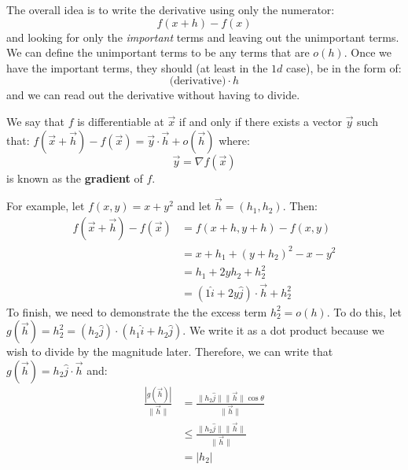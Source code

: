 \begin{itemize}
\begin{idea}
        The overall idea is to write the derivative using only the numerator:
        \begin{equation}
            f(x+h)-f(x)
        \end{equation}
        and looking for only the \textit{important} terms and leaving out the unimportant terms. We can define the unimportant terms to be any terms that are $o(h)$. Once we have the important terms, they should (at least in the $1d$ case), be in the form of:
        \begin{equation}
            \text{(derivative)} \cdot h
        \end{equation}
        and we can read out the derivative without having to divide.
    \end{idea}
    \begin{definition}
        We say that $f$ is differentiable at $\vec{x}$ if and only if there exists a vector $\vec{y}$ such that: $f(\vec{x}+\vec{h})-f(\vec{x})=\vec{y}\cdot\vec{h} + o(\vec{h})$ where:
        \begin{equation}
            \vec{y} = \nabla f(\vec{x})
        \end{equation}
        is known as the \textbf{gradient} of $f$.
    \end{definition}
    \begin{example}
        For example, let $f(x,y)=x+y^2$ and let $\vec{h}=(h_1,h_2)$. Then:
        \begin{align}
            f(\vec{x}+\vec{h})-f(\vec{x}) &= f(x+h, y+h)-f(x,y) \\ 
            &= x+h_1 + (y+h_2)^2 - x-y^2 \\ 
            &= h_1 + 2yh_2 + h_2^2 \\ 
            &= (1\hat{i} + 2y\hat{j})\cdot \vec{h}+h_2^2
        \end{align}
        To finish, we need to demonstrate the the excess term $h_2^2=o(h)$. To do this, let $g(\vec{h})=h_2^2=(h_2 \hat{j}) \cdot (h_1 \hat{i} + h_2\hat{j})$. We write it as a dot product because we wish to divide by the magnitude later. Therefore, we can write that $g(\vec{h}) = h_2\hat{j} \cdot \vec{h}$ and:
        \begin{align}
            \frac{|g(\vec{h})|}{\lVert \vec{h}\rVert} &= \frac{\lVert h_2\hat{j}\rVert \lVert \vec{h}\rVert \cos\theta}{\lVert \vec{h} \rVert} \\ 
            &\le \frac{\lVert h_2\hat{j}\rVert \lVert \vec{h}\rVert}{\lVert \vec{h} \rVert} \\ 
            &=|h_2|

\end{align}
\end{example}
\end{itemize}

